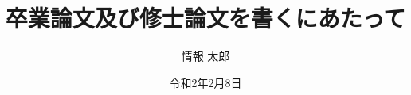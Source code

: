 \documentclass{risepaper}
\title {卒業論文及び修士論文を書くにあたって}
\author{情報 太郎}
\date{令和2年2月8日}
\begin{document}
\maketitle








\insertindex
\printindex
\end{document}
